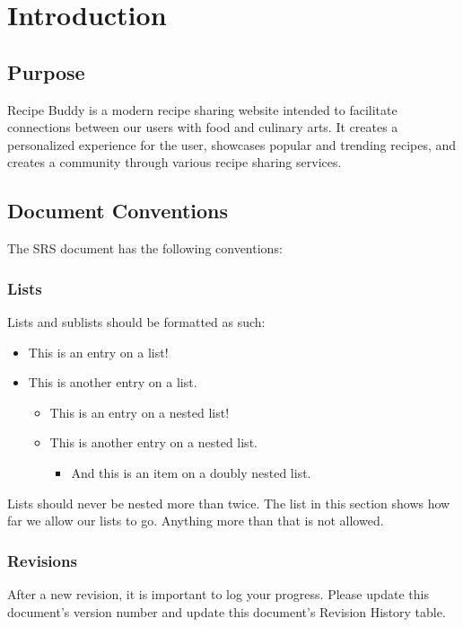 \documentclass{scrreprt}
\begin{document}
\chapter{Introduction}

\section{Purpose}
$ $\gls{Recipe Buddy} is a modern recipe sharing website intended to facilitate connections between our users with food and culinary arts.
It creates a personalized experience for the user, showcases popular and trending recipes, and creates a community through various recipe sharing services.$ $

\section{Document Conventions}
$ $The SRS document has the following conventions:$ $
\subsection{Lists}
$ $Lists and sublists should be formatted as such:
\begin{itemize}
    \item This is an entry on a list!
    \item This is another entry on a list.
          \begin{itemize}
              \item This is an entry on a nested list!
              \item This is another entry on a nested list.
                    \begin{itemize}
                        \item And this is an item on a doubly nested list.
                    \end{itemize}
          \end{itemize}
\end{itemize}
Lists should never be nested more than twice.
The list in this section shows how far we allow our lists to go.
Anything more than that is not allowed.

\subsection{Revisions}
After a new revision, it is important to log your progress.
Please update this document's version number and update this document's Revision History table.
\end{document}
